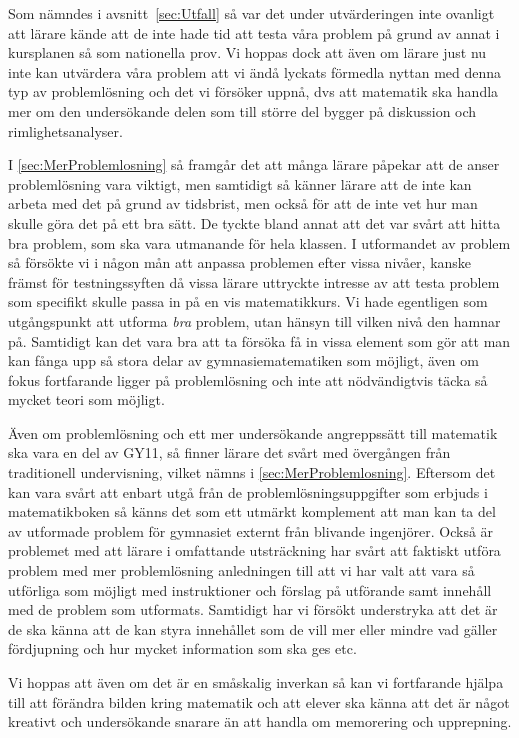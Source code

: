 \textcolor{lila}{Som nämndes i avsnitt~\ref{sec:Utfall} så var det under utvärderingen }\textcolor{Mahogany}{inte ovanligt att lärare kände att de inte hade tid att testa våra problem på grund av annat i kursplanen så som nationella prov. Vi hoppas dock att även om lärare just nu inte kan utvärdera våra problem att vi ändå lyckats förmedla nyttan med denna typ av problemlösning och det vi försöker uppnå, dvs att matematik ska handla mer om den undersökande delen som till större del bygger på diskussion och rimlighetsanalyser.}

\textcolor{Mahogany}{I \ref{sec:MerProblemlosning} så framgår det att många lärare påpekar att de anser problemlösning vara viktigt, men samtidigt så känner lärare att de inte kan arbeta med det på grund av tidsbrist, men också för att de inte vet hur man skulle göra det på ett bra sätt. De tyckte bland annat att det var svårt att hitta bra problem, som ska vara utmanande för hela klassen. I utformandet av problem så försökte vi i någon mån att anpassa problemen efter vissa nivåer, kanske främst för testningssyften då vissa lärare uttryckte intresse av att testa problem som specifikt skulle passa in på en vis matematikkurs. Vi hade egentligen som utgångspunkt att utforma \textit{bra} problem, utan hänsyn till vilken nivå den hamnar på. Samtidigt kan det vara bra att ta försöka få in vissa element som gör att man kan fånga upp så stora delar av gymnasiematematiken som möjligt, även om fokus fortfarande ligger på problemlösning och inte att nödvändigtvis täcka så mycket teori som möjligt.}

\textcolor{Mahogany}{Även om problemlösning och ett mer undersökande angreppssätt till matematik ska vara en del av GY11, så finner lärare det svårt med övergången från traditionell undervisning, vilket nämns i \ref{sec:MerProblemlosning}. Eftersom det kan vara svårt att enbart utgå från de problemlösningsuppgifter som erbjuds i matematikboken så känns det som ett utmärkt komplement att man kan ta del av utformade problem för gymnasiet externt från blivande ingenjörer. Också är problemet med att lärare i omfattande utsträckning har svårt att faktiskt utföra problem med mer problemlösning anledningen till att vi har valt att vara så utförliga som möjligt med instruktioner och förslag på utförande samt innehåll med de problem som utformats. Samtidigt har vi försökt understryka att det är de ska känna att de kan styra innehållet som de vill mer eller mindre vad gäller fördjupning och hur mycket information som ska ges etc.}

\textcolor{Mahogany}{Vi hoppas att även om det är en småskalig inverkan så kan vi fortfarande hjälpa till att förändra bilden kring matematik och att elever ska känna att det är något kreativt och undersökande snarare än att handla om memorering och upprepning.}